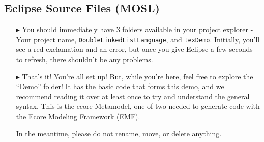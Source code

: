 \newpage
\texHeader
{}

\subsection{Eclipse Source Files (MOSL)}

\begin{itemize}
\FloatBarrier
\item[$\blacktriangleright$] You\hypertarget{simpleDemo tex}{} should immediately have 3 folders available in your project explorer - Your project name,
\texttt{DoubleLinkedListLanguage}, and \texttt{texDemo}. Initially, you'll see a red exclamation and an error, but once you give Eclipse a few seconds to
refresh, there shouldn't be any problems.

\item[$\blacktriangleright$] That's it! You're all set up! But, while you're here, feel free to explore the ``Demo'' folder! It has the basic code that forms
this demo, and we recommend reading it over at least once to try and understand the general syntax. This is the ecore Metamodel, one of two needed to generate
code with the Ecore Modeling Framework (EMF).

In the meantime, please do not rename, move, or delete anything.
\end{itemize}